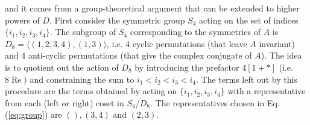 \documentclass[12pt,a4paper]{article}
\DeclareMathOperator{\Real}{Re}
\begin{document}
and it comes from a group-theoretical argument that can be extended to higher powers of $D$. First consider the symmetric group $S_4$ acting on the set of indices $\{i_1, i_2, i_3, i_4\}$. The subgroup of $S_4$ corresponding to the symmetries of $A$ is $D_8 = \langle (1, 2, 3, 4), (1, 3) \rangle$, i.e. 4 cyclic permutations (that leave $A$ invariant) and 4 anti-cyclic permutations (that give the complex conjugate of $A$). The idea is to quotient out the action of $D_8$ by introducing the prefactor $4[1+*]$ (i.e. $8 \Real)$ and constraining the sum to $i_1 < i_2 < i_3 < i_4$. The terms left out by this procedure are the terms obtained by acting on $\{i_1, i_2, i_3, i_4\}$ with a representative from each (left or right) coset in $S_4/D_8$. The representatives chosen in Eq.(\ref{eq:group}) are $(), (3,4)$ and $(2,3)$. 
\end{document}
